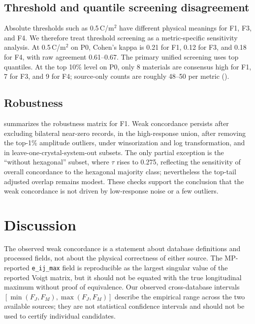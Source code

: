 \documentclass[11pt]{article}
\begin{document}
\subsection{Threshold and quantile screening disagreement}

Absolute thresholds such as 0.5\,C/m$^2$ have different physical meanings for F1, F3, and F4. We therefore treat threshold screening as a metric-specific sensitivity analysis. At 0.5\,C/m$^2$ on P0, Cohen's kappa is 0.21 for F1, 0.12 for F3, and 0.18 for F4, with raw agreement 0.61--0.67. The primary unified screening uses top quantiles. At the top 10\% level on P0, only 8 materials are consensus high for F1, 7 for F3, and 9 for F4; source-only counts are roughly 48--50 per metric ().



\subsection{Robustness}

 summarizes the robustness matrix for F1. Weak concordance persists after excluding bilateral near-zero records, in the high-response union, after removing the top-1\% amplitude outliers, under winsorization and log transformation, and in leave-one-crystal-system-out subsets. The only partial exception is the ``without hexagonal'' subset, where $\tau$ rises to 0.275, reflecting the sensitivity of overall concordance to the hexagonal majority class; nevertheless the top-tail adjusted overlap remains modest. These checks support the conclusion that the weak concordance is not driven by low-response noise or a few outliers.



\section{Discussion}

The observed weak concordance is a statement about database definitions and processed fields, not about the physical correctness of either source. The MP-reported \texttt{e\_ij\_max} field is reproducible as the largest singular value of the reported Voigt matrix, but it should not be equated with the true longitudinal maximum without proof of equivalence. Our observed cross-database intervals $[\min(F_J,F_M), \max(F_J,F_M)]$ describe the empirical range across the two available sources; they are not statistical confidence intervals and should not be used to certify individual candidates.
\end{document}
